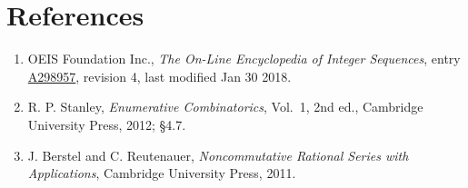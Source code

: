 \documentclass[11pt]{article}
\theoremstyle{definition}
\begin{document}
\section{References}

\begin{enumerate}

\item OEIS Foundation Inc., \emph{The On-Line Encyclopedia of Integer Sequences}, entry \href{https://oeis.org/A298957}{A298957}, revision 4, last modified Jan 30 2018.

\item R. P. Stanley, \emph{Enumerative Combinatorics}, Vol.~1, 2nd ed., Cambridge University Press, 2012; \S4.7.

\item J. Berstel and C. Reutenauer, \emph{Noncommutative Rational Series with Applications}, Cambridge University Press, 2011.

\end{enumerate}
\end{document}
